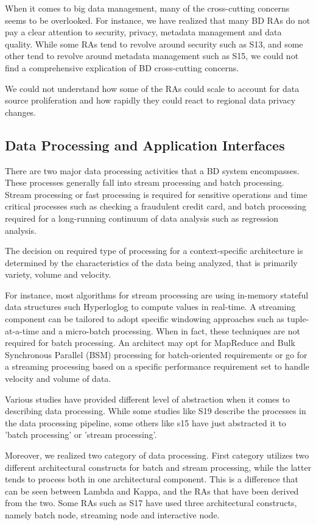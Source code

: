 \documentclass[review]{elsarticle}
\begin{document}
When it comes to big data management, many of the cross-cutting concerns seems to be overlooked. For instance, we have realized that many BD RAs do not pay a clear attention to security, privacy, metadata management and data quality. While some RAs tend to revolve around security such as S13, and some other tend to revolve around metadata management such as S15, we could not find a comprehensive explication of BD cross-cutting concerns.

We could not understand how some of the RAs could scale to account for data source proliferation and how rapidly they could react to regional data privacy changes. 

\subsection{Data Processing and Application Interfaces}

There are two major data processing activities that a BD system encompasses. These processes generally fall into stream processing and batch processing. Stream processing or fast processing is required for sensitive operations and time critical processes such as checking a fraudulent credit card, and batch processing required for a long-running continuum of data analysis such as regression analysis. 

The decision on required type of processing for a context-specific architecture is determined by the characteristics of the data being analyzed, that is primarily variety, volume and velocity. 

For instance, most algorithms for stream processing are using in-memory stateful data structures such Hyperloglog to compute values in real-time. A streaming component can be tailored to adopt specific windowing approaches such as tuple-at-a-time and a micro-batch processing. When in fact, these techniques are not required for batch processing. An architect may opt for MapReduce and Bulk Synchronous Parallel (BSM) processing for batch-oriented requirements or go for a streaming processing based on a specific performance requirement set to handle velocity and volume of data. 

Various studies have provided different level of abstraction when it comes to describing data processing. While some studies like S19 describe the processes in the data processing pipeline, some others like s15 have just abstracted it to 'batch processing' or 'stream processing'. 

Moreover, we realized two category of data processing. First category utilizes two different architectural constructs for batch and stream processing, while the latter tends to process both in one architectural component. This is a difference that can be seen between Lambda and Kappa, and the RAs that have been derived from the two. Some RAs such as S17 have used three architectural constructs, namely batch node, streaming node and interactive node. 
\end{document}
